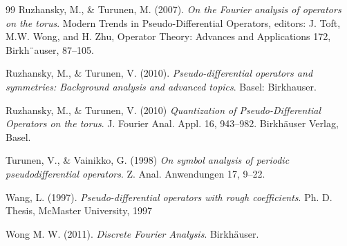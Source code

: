 \documentclass[12pt, reqno]{amsart}
\theoremstyle{definition}
\theoremstyle{remark}
\numberwithin{equation}{section}
\begin{document}
\begin{thebibliography}{99}
Ruzhansky, M., \& Turunen, M. (2007). \textit{On the Fourier analysis of operators on the torus}. Modern Trends in Pseudo-Differential Operators, editors: J. Toft, M.W. Wong,
and H. Zhu, Operator Theory: Advances and Applications 172, Birkh¨auser,
87–105.

Ruzhansky, M., \& Turunen, V. (2010). \textit{Pseudo-differential operators and symmetries: Background analysis and advanced topics}. Basel: Birkhauser. 

Ruzhansky, M., \& Turunen, V. (2010) \textit{Quantization of Pseudo-Differential Operators on the torus}. J. Fourier
Anal. Appl. 16, 943–982. Birkhäuser Verlag, Basel.

Turunen, V., \& Vainikko, G. (1998) \textit{On symbol analysis of periodic pseudodifferential operators}. Z. Anal. Anwendungen 17, 9–22.

Wang, L. (1997). \textit{Pseudo-differential operators with rough coefficients}. Ph. D. Thesis, McMaster University, 1997

Wong M. W. (2011). \textit{Discrete Fourier Analysis}. Birkhäuser.


\end{thebibliography}
\end{document}
